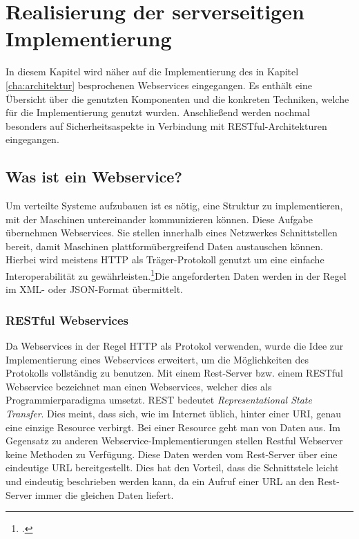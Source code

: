 \chapter{Realisierung der serverseitigen Implementierung}
\label{cha:server-impl}
In diesem Kapitel wird näher auf die Implementierung des in Kapitel \ref{cha:architektur} besprochenen Webservices eingegangen. Es enthält eine Übersicht über die genutzten Komponenten und die konkreten Techniken, welche für die Implementierung genutzt wurden. Anschließend werden nochmal besonders auf Sicherheitsaspekte in Verbindung mit RESTful-Architekturen eingegangen. 

\section{Was ist ein Webservice?}
\label{sec:definition-webservice}
Um verteilte Systeme aufzubauen ist es nötig, eine Struktur zu implementieren, mit der Maschinen untereinander kommunizieren können. Diese Aufgabe übernehmen Webservices. Sie stellen innerhalb eines Netzwerkes Schnittstellen bereit, damit Maschinen plattformübergreifend Daten austauschen können. Hierbei wird meistens HTTP als Träger-Protokoll genutzt um eine einfache Interoperabilität zu gewährleisten.\footcite{Definition-Webservice}Die angeforderten Daten werden in der Regel im XML- oder JSON-Format übermittelt. 

\subsection{RESTful Webservices}
\label{sec:definition-rest}
Da Webservices in der Regel \ac{HTTP} als Protokol verwenden, wurde die Idee zur Implementierung eines Webservices erweitert, um die Möglichkeiten des Protokolls vollständig zu benutzen. Mit einem Rest-Server bzw. einem RESTful Webservice bezeichnet man einen Webservices, welcher dies als Programmierparadigma umsetzt. REST bedeutet \textit{Representational State Transfer}. Dies meint, dass sich, wie im Internet üblich, hinter einer \ac{URI}, genau eine einzige Resource verbirgt. Bei einer Resource geht man von Daten aus. Im Gegensatz zu anderen Webservice-Implementierungen stellen Restful Webserver keine Methoden zu Verfügung. Diese Daten werden vom Rest-Server über eine eindeutige URL bereitgestellt. Dies hat den Vorteil, dass die Schnittstele leicht und eindeutig beschrieben werden kann, da ein Aufruf einer URL an den Rest-Server immer die gleichen Daten liefert. 


